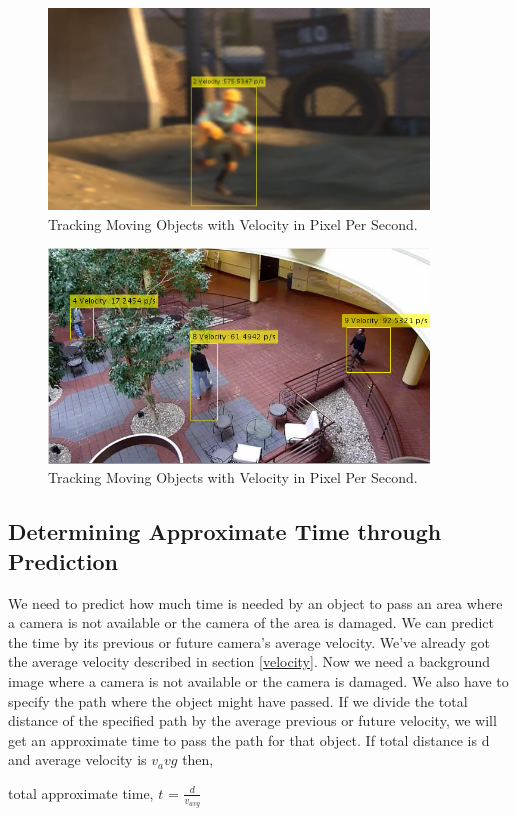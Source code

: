 \begin{figure}[H]
  \centering
  \includegraphics[width=0.9\textwidth]{figures/man1v}
  \caption{Tracking Moving Objects with Velocity in Pixel Per Second.}
  \label{fig:man1v}
\end{figure} 

\begin{figure}[H]
  \centering
  \includegraphics[width=0.9\textwidth]{figures/man3v}
  \caption{Tracking Moving Objects with Velocity in Pixel Per Second.}
  \label{fig:man3v}
\end{figure} 

\subsection{Determining Approximate Time through Prediction}

We need to predict how much time is needed by an object to pass an area where a camera is not available or the camera of the area is damaged. We can predict the time by its previous or future camera's average velocity. We've already got the average velocity described in section \ref{velocity}. Now we need a background image where a camera is not available or the camera is damaged. We also have to specify the path where the object might have passed. If we divide the total distance of the specified path by the average previous or future velocity, we will get an approximate time to pass the path for that object. If total distance is d and average velocity is $v_avg$ then,
\newline
\newline
\centerline{total approximate time, $t$ = $\frac{d}{v_{avg}}$}

